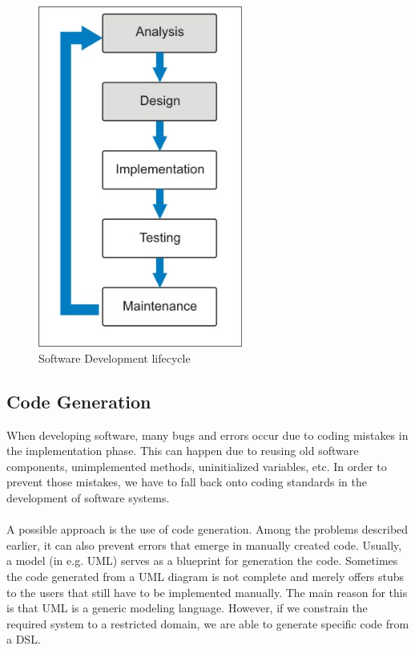 \begin{figure}[htb]
\centering
\includegraphics[width=0.6\textwidth]{images/lifecycle.jpg}
\caption{Software Development lifecycle}
\label{fig:lifecycle}
\end{figure}

\subsection{Code Generation}

When developing software, many bugs and errors occur due to coding mistakes in the implementation phase. This can happen due to reusing old software components, unimplemented methods, uninitialized variables, etc. In order to prevent those mistakes, we have to fall back onto coding standards in the development of software systems.
\\ \\
A possible approach is the use of code generation. Among the problems described earlier, it can also prevent errors that emerge in manually created code. Usually, a model (in e.g. UML) serves as a blueprint for generation the code. Sometimes the code generated from a UML diagram is not complete and merely offers stubs to the users that still have to be implemented manually. The main reason for this is that UML is a generic modeling language. However, if we constrain the required system to a restricted domain, we are able to generate specific code from a DSL. 

